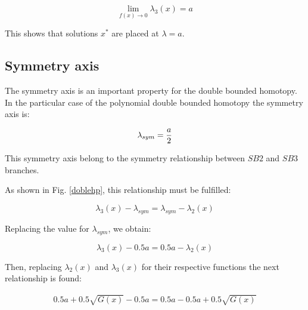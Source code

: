 \documentclass{elex}
\begin{document}
\begin{equation}
 \displaystyle\lim_{f(x) \to{0}}{\lambda_3(x)}=a 
 \label{demos2x}
\end{equation}

This shows that solutions $x^*$ are placed at $\lambda=a$.

\subsection{Symmetry axis}

The symmetry axis is an important property for the double bounded homotopy. In the particular case of the polynomial double bounded homotopy the symmetry axis is:

\begin{equation}
\lambda_{sym}= {a \over 2}
\label{sym}
\end{equation}

This symmetry axis belong to the symmetry relationship between $SB2$ and $SB3$ branches.

As shown in Fig. \ref{doblehp}, this relationship must be fulfilled:

\begin{displaymath}
\lambda_3(x)-\lambda_{sym}=\lambda_{sym} -\lambda_2(x)
\end{displaymath}

Replacing the value for $\lambda_{sym}$, we obtain:

\begin{displaymath}
\lambda_3(x)-0.5a=0.5a-\lambda_2(x)
\end{displaymath}

Then, replacing $\lambda_2(x)$ and $\lambda_3(x)$ for their respective functions the next relationship is found:

\begin{displaymath}
\begin{array}{l}
0.5a+0.5\sqrt{G(x)}-0.5a= 0.5a-0.5a+0.5\sqrt{G(x)}
\end{array}
\end{displaymath}
\end{document}
